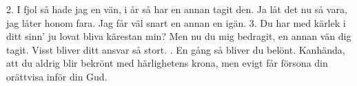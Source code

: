 \setlength{\columnsep}{0.2cm}
\begin{multicols}{2}
2.  I fjol så hade jag en vän,
    i år så har en annan tagit den.
    Ja låt det nu så vara,
    jag låter honom fara.
    Jag får väl snart en annan en igän.
3.  Du har med kärlek i ditt sinn'
    ju lovat bliva kärestan min?
    Men nu du mig bedragit,
    en annan vän dig tagit.
    Visst bliver ditt ansvar så stort.
\vfill{}.  En gång så bliver du belönt.
    Kanhända, att du aldrig blir bekrönt
    med härlighetens krona,
    men evigt får försona
    din orättvisa inför din Gud.
\end{multicols}
